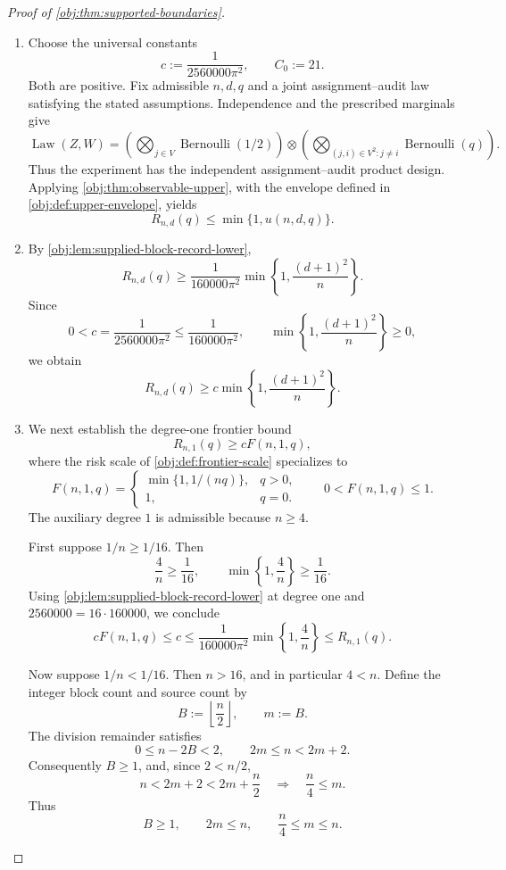 \begin{proof}[Proof of \cref{obj:thm:supported-boundaries}]
\begin{enumerate}
\item Choose the universal constants
\[
c:=\frac{1}{2560000\pi^2},
\qquad
C_0:=21.
\]
Both are positive. Fix admissible \(n,d,q\) and a joint assignment--audit law satisfying the stated assumptions. Independence and the prescribed marginals give
\[
\operatorname{Law}(Z,W)
=
\left(\bigotimes_{j\in V}\operatorname{Bernoulli}(1/2)\right)
\otimes
\left(\bigotimes_{(j,i)\in V^2:j\ne i}
\operatorname{Bernoulli}(q)\right).
\]
Thus the experiment has the independent assignment--audit product design. %
Applying \cref{obj:thm:observable-upper}, with the envelope defined in \cref{obj:def:upper-envelope}, yields
\[
R_{n,d}(q)\le \min\{1,u(n,d,q)\}.
\]

\item By \cref{obj:lem:supplied-block-record-lower},
\[
R_{n,d}(q)\ge
\frac{1}{160000\pi^2}
\min\left\{1,\frac{(d+1)^2}{n}\right\}.
\]
Since
\[
0<c=\frac{1}{2560000\pi^2}
\le \frac{1}{160000\pi^2},
\qquad
\min\left\{1,\frac{(d+1)^2}{n}\right\}\ge0,
\]
we obtain
\[
R_{n,d}(q)\ge
c\min\left\{1,\frac{(d+1)^2}{n}\right\}.
\]

\item We next establish the degree-one frontier bound
\[
R_{n,1}(q)\ge cF(n,1,q),
\]
where the risk scale of \cref{obj:def:frontier-scale} specializes to
\[
F(n,1,q)=
\begin{cases}
\min\{1,1/(nq)\},&q>0,\\
1,&q=0.
\end{cases}
\qquad
0<F(n,1,q)\le1.
\]
The auxiliary degree \(1\) is admissible because \(n\ge4\).

First suppose \(1/n\ge1/16\). Then
\[
\frac4n\ge\frac1{16},
\qquad
\min\left\{1,\frac4n\right\}\ge\frac1{16}.
\]
Using \cref{obj:lem:supplied-block-record-lower} at degree one and
\(2560000=16\cdot160000\), we conclude
\[
cF(n,1,q)
\le c
\le
\frac{1}{160000\pi^2}\min\left\{1,\frac4n\right\}
\le R_{n,1}(q).
\]

Now suppose \(1/n<1/16\). Then \(n>16\), and in particular \(4<n\). Define the integer block count and source count by
\[
B:=\left\lfloor\frac n2\right\rfloor,
\qquad
m:=B.
\]
The division remainder satisfies
\[
0\le n-2B<2,
\qquad
2m\le n<2m+2.
\]
Consequently \(B\ge1\), and, since \(2<n/2\),
\[
n<2m+2<2m+\frac n2
\quad\Longrightarrow\quad
\frac n4\le m.
\]
Thus
\[
B\ge1,\qquad 2m\le n,\qquad \frac n4\le m\le n.
\]


\end{enumerate}
\end{proof}
